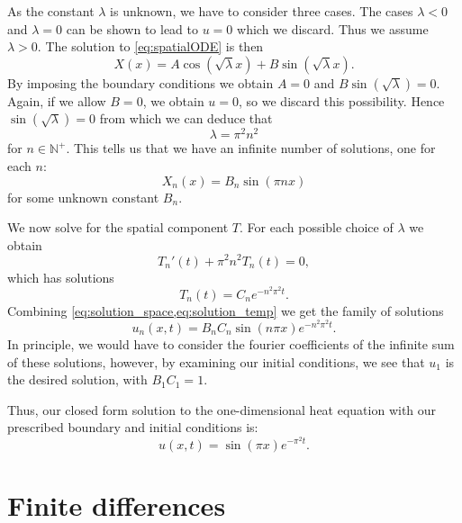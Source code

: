 \documentclass[article, a4paper, oneside]{memoir}
\begin{document}
	As the constant \( \lambda \) is unknown, we have to consider three
	cases. The cases \( \lambda < 0 \) and \( \lambda = 0 \) can be shown
	to lead to \( u = 0\) which we discard. Thus we assume \( \lambda >
	0\).  The solution to \cref{eq:spatialODE} is then
	\begin{equation}
		X(x) = A\cos(\sqrt{\lambda}x) + B\sin(\sqrt{\lambda}x).
	\end{equation}
	By imposing the boundary conditions we obtain \( A = 0 \) and \(
	B\sin(\sqrt{\lambda}) = 0 \). Again, if we allow \( B = 0\), we obtain
	\( u = 0\), so we discard this possibility. Hence \( \sin(\sqrt{\lambda}) = 0
	\) from which we can deduce that
	\begin{equation}
		\lambda = \pi^2 n^2 
	\end{equation}
	for \( n \in \mathbb{N}^+\). This tells us that we have an infinite
	number of solutions, one for each \( n \):
	\begin{equation}
		\label{eq:solution_space}
		X_n(x) = B_n\sin(\pi n x)
	\end{equation}
	for some unknown constant \( B_n \).
	

	We now solve for the spatial component \( T \). For each possible
	choice of \( \lambda \) we obtain
	\begin{equation}
		T_n'(t) +\pi^2 n^2T_n(t) = 0, 
	\end{equation}
	which has solutions
	\begin{equation}
		\label{eq:solution_temp}
		T_n(t) = C_n e^{-n^2\pi^2t}.
	\end{equation}
	Combining \cref{eq:solution_space,eq:solution_temp} we get the family of solutions
	\begin{equation}
		u_n(x, t) = B_n C_n \sin(n\pi x)e^{-n^2\pi^2t}.
	\end{equation}
	In principle, we would have to consider the fourier coefficients of the
	infinite sum of these solutions, however, by examining our initial
	conditions, we see that \( u_1 \) is the desired solution, with \( B_1
	C_1 = 1 \).

	Thus, our closed form solution to the one-dimensional heat equation
	with our prescribed boundary and initial conditions is:
	\begin{equation}
		u(x, t) = \sin(\pi x) e^{-\pi^2 t}.
	\end{equation}
	
	\section{Finite differences}
\end{document}
